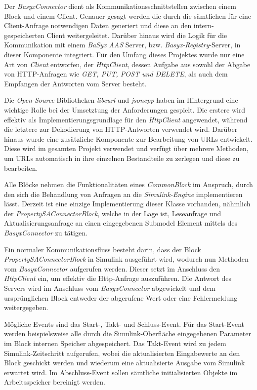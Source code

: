 Der \textit{BasyxConnector} dient als Kommunikationsschnittstellen zwischen einem Block und einem Client. Genauer gesagt werden die durch die sämtlichen für eine Client-Anfrage notwendigen Daten generiert und diese an den intern-gespeicherten Client weitergeleitet. Darüber hinaus wird die Logik für die Kommunikation mit einem \textit{BaSyx AAS} Server, bzw. \textit{Basyx-Registry}-Server, in dieser Komponente integriert. Für den Umfang dieses Projektes wurde nur eine Art von \textit{Client} entworfen, der \textit{HttpClient}, dessen Aufgabe aus sowohl der Abgabe von HTTP-Anfragen wie \textit{GET, PUT, POST und DELETE}, als auch dem Empfangen der Antworten vom Server besteht.

Die \textit{Open-Source} Bibliotheken \textit{libcurl} und \textit{jsoncpp} haben im Hintergrund eine wichtige Rolle bei der Umsetztung der Anforderungen gespielt. Die erstere wird effektiv als Implementierungsgrundlage für den \textit{HttpClient} angewendet, während die letztere zur Dekodierung von HTTP-Antworten verwendet wird. Darüber hinaus wurde eine zusätzliche Komponente zur Bearbeitung von URLs entwickelt. Diese wird im gesamten Projekt verwendet und verfügt über mehrere Methoden, um URLs automatisch in ihre einzelnen Bestandteile zu zerlegen und diese zu bearbeiten. 

Alle Blöcke nehmen die Funktionalitäten eines \textit{CommonBlock} im Anspruch, durch den sich die Behandlung von Anfragen an die \textit{Simulink-Engine} implementieren lässt. Derzeit ist eine einzige Implementierung dieser Klasse vorhanden, nähmlich der \textit{PropertySAConnectorBlock}, welche in der Lage ist, Leseanfrage und Aktualisierungsanfrage an einen eingegebenen Submodel Element mittels des \textit{BasyxConnector} zu tätigen. 

Ein normaler Kommunikationsfluss besteht darin, dass der Block \textit{PropertySAConnectorBlock} in Simulink ausgeführt wird, wodurch nun Methoden vom  \textit{BasyxConnector} aufgerufen werden. Dieser setzt im Anschluss den \textit{HttpClient} ein, um effektiv die Http-Anfrage auszuführen. Die Antwort des Servers wird im Anschluss vom \textit{BasyxConnector} abgewickelt und dem ursprünglichen Block entweder der abgerufene Wert oder eine Fehlermeldung weitergegeben.

Mögliche Events sind das Start-, Takt- und Schluss-Event. Für das Start-Event werden beispielsweise alle durch die Simulink-Oberfläche eingegebenen Parameter im Block internen Speicher abgespeichert. Das Takt-Event wird zu jedem Simulink-Zeitschritt aufgerufen, wobei die aktualisierten Eingabewerte an den Block geschickt werden und wiederum eine aktualisierte Ausgabe vom Simulink erwartet wird. Im Abschluss-Event sollen sämtliche initialisierten Objekte im Arbeitsspeicher bereinigt werden.

